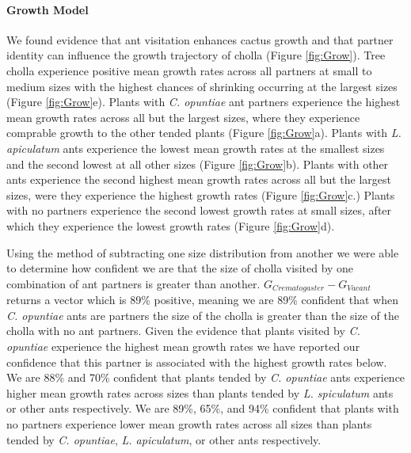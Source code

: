 \documentclass[11pt]{article}
\begin{document}
\paragraph{Growth Model} We found evidence that ant visitation enhances cactus growth and that partner identity can influence the growth trajectory of cholla (Figure \ref{fig:Grow}). 
Tree cholla experience positive mean growth rates across all partners at small to medium sizes with the highest chances of shrinking occurring at the largest sizes (Figure \ref{fig:Grow}e).
Plants with \textit{C. opuntiae} ant partners experience the highest mean growth rates across all but the largest sizes, where they experience comprable growth to the other tended plants (Figure \ref{fig:Grow}a). 
Plants with \textit{L. apiculatum} ants experience the lowest mean growth rates at the smallest sizes and the second lowest at all other sizes (Figure \ref{fig:Grow}b). 
Plants with other ants experience the second highest mean growth rates across all but the largest sizes, were they experience the highest growth rates (Figure \ref{fig:Grow}c.)
Plants with no partners experience the second lowest growth rates at small sizes, after which they experience the lowest growth rates (Figure \ref{fig:Grow}d). 

Using the method of subtracting one size distribution from another we were able to determine how confident we are that the size of cholla visited by one combination of ant partners is greater than another. 
$G_{Crematogaster} - G_{Vacant}$ returns a vector which is 89\% positive, meaning we are 89\% confident that when \textit{C. opuntiae} ants are partners the size of the cholla is greater than the size of the cholla with no ant partners.
Given the evidence that plants visited by \textit{C. opuntiae} experience the highest mean growth rates we have reported our confidence that this partner is associated with the highest growth rates below. 
We are 88\% and 70\% confident that plants tended by \textit{C. opuntiae} ants experience higher mean growth rates across sizes than plants tended by \textit{L. spiculatum} ants or other ants respectively.
We are 89\%, 65\%, and 94\% confident that plants with no partners experience lower mean growth rates across all sizes than plants tended by \textit{C. opuntiae}, \textit{L. apiculatum}, or other ants respectively.
\end{document}
